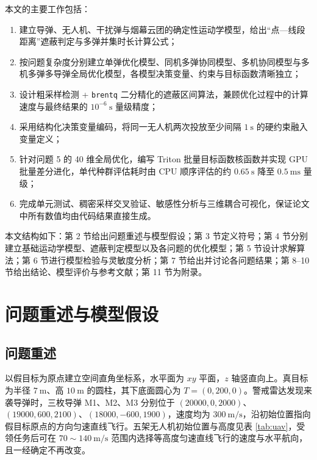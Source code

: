\documentclass[11pt,a4paper]{ctexart}
\begin{document}
本文的主要工作包括：
\begin{enumerate}
  \item 建立导弹、无人机、干扰弹与烟幕云团的确定性运动学模型，给出“点—线段距离”遮蔽判定与多弹并集时长计算公式；
  \item 按问题复杂度分别建立单弹优化模型、同机多弹协同模型、多机协同模型与多机多弹多导弹全局优化模型，各模型决策变量、约束与目标函数清晰独立；
  \item 设计粗采样检测 + \texttt{brentq} 二分精化的遮蔽区间算法，兼顾优化过程中的计算速度与最终结果的 $10^{-6}~\mathrm{s}$ 量级精度；
  \item 采用结构化决策变量编码，将同一无人机两次投放至少间隔 $1~\mathrm{s}$ 的硬约束融入变量定义；
  \item 针对问题 5 的 40 维全局优化，编写 Triton 批量目标函数核函数并实现 GPU 批量差分进化，单代种群评估耗时由 CPU 顺序评估的约 $0.65~\mathrm{s}$ 降至 $0.5~\mathrm{ms}$ 量级；
  \item 完成单元测试、稠密采样交叉验证、敏感性分析与三维耦合可视化，保证论文中所有数值均由代码结果直接生成。
\end{enumerate}

本文结构如下：第 2 节给出问题重述与模型假设；第 3 节定义符号；第 4 节分别建立基础运动学模型、遮蔽判定模型以及各问题的优化模型；第 5 节设计求解算法；第 6 节进行模型检验与灵敏度分析；第 7 节给出并讨论各问题结果；第 8--10 节给出结论、模型评价与参考文献；第 11 节为附录。

\section{问题重述与模型假设}

\subsection{问题重述}

以假目标为原点建立空间直角坐标系，水平面为 $xy$ 平面，$z$ 轴竖直向上。真目标为半径 $7~\mathrm{m}$、高 $10~\mathrm{m}$ 的圆柱，其下底面圆心为 $T=(0,200,0)$。警戒雷达发现来袭导弹时，三枚导弹 M1、M2、M3 分别位于 $(20000,0,2000)$、$(19000,600,2100)$、$(18000,-600,1900)$，速度均为 $300~\mathrm{m/s}$，沿初始位置指向假目标原点的方向匀速直线飞行。五架无人机初始位置与高度见表 \ref{tab:uav}，受领任务后可在 $70\sim140~\mathrm{m/s}$ 范围内选择等高度匀速直线飞行的速度与水平航向，且一经确定不再改变。
\end{document}
